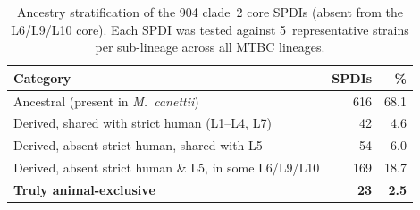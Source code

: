 \documentclass[11pt,a4paper]{article}
\begin{document}
\begin{table}[h]
\centering
\caption{Ancestry stratification of the 904 clade~2 core SPDIs (absent from
the L6/L9/L10 core). Each SPDI was tested against 5~representative strains
per sub-lineage across all MTBC lineages.}
\label{tab:animal_stratification}
\begin{tabular}{@{}lrr@{}}
\toprule
\textbf{Category} & \textbf{SPDIs} & \textbf{\%} \\
\midrule
Ancestral (present in \textit{M.~canettii}) & 616 & 68.1 \\
Derived, shared with strict human (L1--L4, L7) & 42 & 4.6 \\
Derived, absent strict human, shared with L5 & 54 & 6.0 \\
Derived, absent strict human \& L5, in some L6/L9/L10 & 169 & 18.7 \\
\textbf{Truly animal-exclusive} & \textbf{23} & \textbf{2.5} \\
\bottomrule
\end{tabular}
\end{table}
\end{document}
